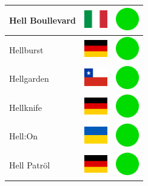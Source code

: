 \documentclass[12pt, a4paper, twoside]{report}
\begin{document}
\begin{center}
\begin{longtable}{|p{5cm}|p{2cm}|p{2cm}|}
 Hell Boullevard                                            & \includegraphics[width=1cm]{../4x3/it} &   \includegraphics[width=1cm]{../likes/y} \\ \hline
 Hellburst                                                  & \includegraphics[width=1cm]{../4x3/de} &   \includegraphics[width=1cm]{../likes/y} \\ \hline
 Hellgarden                                                 & \includegraphics[width=1cm]{../4x3/cl} &   \includegraphics[width=1cm]{../likes/y} \\ \hline
 Hellknife                                                  & \includegraphics[width=1cm]{../4x3/de} &   \includegraphics[width=1cm]{../likes/y} \\ \hline
 Hell:On                                                    & \includegraphics[width=1cm]{../4x3/ua} &   \includegraphics[width=1cm]{../likes/y} \\ \hline
 Hell Patröl                                                & \includegraphics[width=1cm]{../4x3/de} &   \includegraphics[width=1cm]{../likes/y} \\ \hline

\end{longtable}
\end{center}
\end{document}
